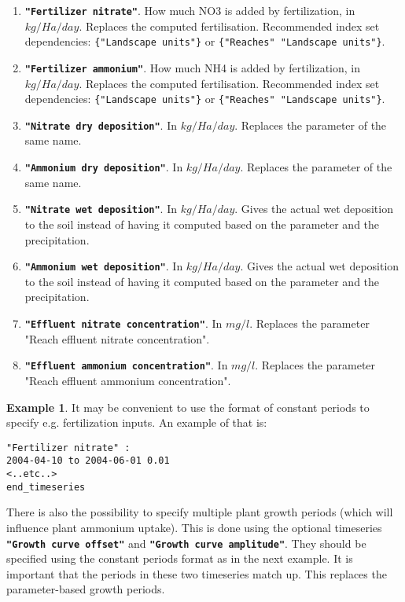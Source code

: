 \documentclass[11pt]{article}
\theoremstyle{definition}
\newtheorem{myexample}{Example}
\newenvironment{example}%
  {\begin{lrbox}{\examplebox}%
   \begin{minipage}{\dimexpr\linewidth-2\fboxsep}
   \begin{myexample}}%
  {\end{myexample}%
   \end{minipage}%
   \end{lrbox}%
   \begin{trivlist}
     \item[]\colorbox{silver}{\usebox\examplebox}
   \end{trivlist}}
\begin{document}
\begin{enumerate}[i]
\item {\bf\tt "Fertilizer nitrate"}. How much NO3 is added by fertilization, in $kg/Ha/day$. Replaces the computed fertilisation. Recommended index set dependencies: {\tt \{"Landscape units"\}} or {\tt \{"Reaches" "Landscape units"\}}.
\item {\bf\tt "Fertilizer ammonium"}. How much NH4 is added by fertilization, in $kg/Ha/day$. Replaces the computed fertilisation. Recommended index set dependencies: {\tt \{"Landscape units"\}} or {\tt \{"Reaches" "Landscape units"\}}.
\item {\bf\tt "Nitrate dry deposition"}. In $kg/Ha/day$. Replaces the parameter of the same name.
\item {\bf\tt "Ammonium dry deposition"}. In $kg/Ha/day$. Replaces the parameter of the same name.
\item {\bf\tt "Nitrate wet deposition"}. In $kg/Ha/day$. Gives the actual wet deposition to the soil instead of having it computed based on the parameter and the precipitation.
\item {\bf\tt "Ammonium wet deposition"}. In $kg/Ha/day$. Gives the actual wet deposition to the soil instead of having it computed based on the parameter and the precipitation.
\item {\bf\tt "Effluent nitrate concentration"}. In $mg/l$. Replaces the parameter "Reach effluent nitrate concentration".
\item {\bf\tt "Effluent ammonium concentration"}. In $mg/l$. Replaces the parameter "Reach effluent ammonium concentration".
\end{enumerate}

\begin{example}
It may be convenient to use the format of constant periods to specify e.g. fertilization inputs. An example of that is:
\begin{lstlisting}
"Fertilizer nitrate" :
2004-04-10 to 2004-06-01 0.01
<..etc..>
end_timeseries
\end{lstlisting}
\end{example}

There is also the possibility to specify multiple plant growth periods (which will influence plant ammonium uptake). This is done using the optional timeseries {\tt\bf "Growth curve offset"} and {\tt\bf "Growth curve amplitude"}. They should be specified using the constant periods format as in the next example. It is important that the periods in these two timeseries match up. This replaces the parameter-based growth periods.
\end{document}
